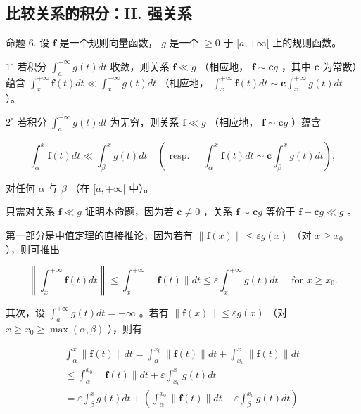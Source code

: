 \subsection{比较关系的积分：II. 强关系}

命题 6. 设 \(\mathbf{f}\) 是一个规则向量函数， \(g\) 是一个 \(\geqslant 0\) 于 \([a, +\infty[\) 上的规则函数。

\(1^{\circ}\) 若积分 \(\int_{a}^{+\infty} g(t) dt\) 收敛，则关系 \(\mathbf{f} \ll g\) （相应地， \(\mathbf{f} \sim \mathbf{c}g\) ，其中 \(\mathbf{c}\) 为常数）蕴含 \(\int_{x}^{+\infty} \mathbf{f}(t) dt \ll \int_{x}^{+\infty} g(t) dt\) （相应地， \(\int_{x}^{+\infty} \mathbf{f}(t) dt \sim \mathbf{c} \int_{x}^{+\infty} g(t) dt\) ）。

\(2^{\circ}\) 若积分 \(\int_{a}^{+\infty} g(t) dt\) 为无穷，则关系 \(\mathbf{f} \ll g\) （相应地， \(\mathbf{f} \sim \mathbf{c}g\) ）蕴含

\[
\int_ {\alpha} ^ {x} \mathbf {f} (t) d t \ll \int_ {\beta} ^ {x} g (t) d t \quad (\text { resp. } \quad \int_ {\alpha} ^ {x} \mathbf {f} (t) d t \sim \mathbf {c} \int_ {\beta} ^ {x} g (t) d t),
\]

对任何 \(\alpha\) 与 \(\beta\) （在 \([a, +\infty[\) 中）。

只需对关系 \(\mathbf{f} \ll g\) 证明本命题，因为若 \(\mathbf{c} \neq 0\) ，关系 \(\mathbf{f} \sim \mathbf{c}g\) 等价于 \(\mathbf{f} - \mathbf{c}g \ll g\) 。

第一部分是中值定理的直接推论，因为若有 \(\|\mathbf{f}(x)\| \leqslant \varepsilon g(x)\) （对 \(x \geqslant x_{0}\) ），则可推出

\[
\left\| \int_ {x} ^ {+ \infty} \mathbf {f} (t) d t \right\| \leqslant \int_ {x} ^ {+ \infty} \| \mathbf {f} (t) \| d t \leqslant \varepsilon \int_ {x} ^ {+ \infty} g (t) d t \quad \text { for } x \geqslant x _ {0}.
\]

其次，设 \(\int_{a}^{+\infty} g(t) dt = +\infty\) 。若有 \(\| \mathbf{f}(x) \| \leqslant \varepsilon g(x)\) （对 \(x \geqslant x_0 \geqslant \max(\alpha, \beta)\) ），则有

\[
\begin{array}{l} \int_ {\alpha} ^ {x} \| \mathbf {f} (t) \| d t = \int_ {\alpha} ^ {x _ {0}} \| \mathbf {f} (t) \| d t + \int_ {x _ {0}} ^ {x} \| \mathbf {f} (t) \| d t \\ \leqslant \int_ {\alpha} ^ {x _ {0}} \| \mathbf {f} (t) \| d t + \varepsilon \int_ {x _ {0}} ^ {x} g (t) d t \\ = \varepsilon \int_ {\beta} ^ {x} g (t) d t + \left(\int_ {\alpha} ^ {x _ {0}} \| \mathbf {f} (t) \| d t - \varepsilon \int_ {\beta} ^ {x _ {0}} g (t) d t\right). \end{array}
\]

